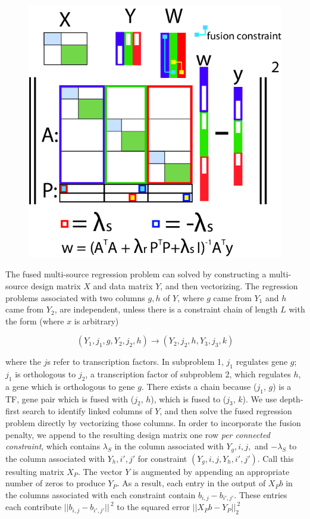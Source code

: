\documentclass[11pt]{article}
\begin{document}
\begin{figure}[h!]
    \centering
    \includegraphics[scale=.5,trim=0mm 0mm 0mm 0mm,clip]{direct_solve.png}
\end{figure}

The fused multi-source regression problem can solved by constructing a multi-source design matrix $X$ and data matrix $Y$, and then vectorizing.
The regression problems associated with two columns $g,h$ of $Y$, where $g$ came from $Y_1$ and $h$ came from $Y_2$, are independent, unless there is a constraint chain of length $L$ with the form (where $x$ is arbitrary)

$$(Y_1, j_1, g, Y_2, j_2, h) \rightarrow (Y_2, j_2, h, Y_3, j_3, k)$$

where the $j$s refer to transcription factors. In subproblem 1, $j_1$ regulates gene $g$; $j_1$ is orthologous to $j_2$, a transcription factor of subproblem 2, which regulates $h$, a gene which is orthologous to gene $g$. There exists a chain because ($j_1$, $g$) is a TF, gene pair which is fused with ($j_2$, $h$), which is fused to ($j_3$, $k$).
We use depth-first search to identify linked columns of $Y$, and then solve the fused regression problem directly by vectorizing those columns.
In order to incorporate the fusion penalty, we append to the resulting design matrix one row \emph{per connected constraint}, which contains $\lambda_S$ in the column associated with $Y_g,i,j,$ and $-\lambda_S$ to the column associated with $Y_h, i',j'$ for constraint $(Y_g,i,j,Y_h,i',j')$. Call this resulting matrix $X_P$.
The vector $Y$ is augmented by appending an appropriate number of zeros to produce $Y_P$. As a result, each entry in the output of $X_P b$ in the columns associated with each constraint contain $b_{i,j} - b_{i',j'}$.
These entries each contribute  $||b_{i,j} - b_{i',j'}||^{~2}$ to the squared error $||X_Pb - Y_P||_2^{~2}$
\end{document}
